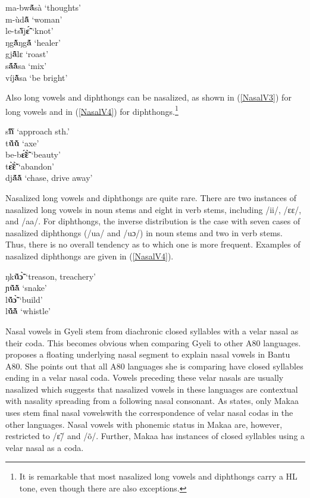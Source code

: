 \begin{exe} \ex \label{NasalV2}
ma-bw{\bfseries ã́}sà `thoughts' \\
 m-ùd{\bfseries ã̂} `woman' \\
le-ts{\bfseries ĩ̀}j{\bfseries ɛ̃́} `knot' \\
ŋg{\bfseries ã̀}ŋg{\bfseries ã́} `healer' \\
gj{\bfseries ã̂}lɛ `roast' \\
s{\bfseries ã́ã̀}sa `mix' \\
víj{\bfseries ã̀}sa `be bright'
\end{exe}

\noindent Also long vowels and diphthongs can be nasalized, as shown in (\ref{NasalV3}) for long vowels and in (\ref{NasalV4}) for diphthongs.\footnote{It is remarkable that most nasalized long vowels and diphthongs carry a HL tone, even though there are also exceptions.}

\begin{exe} \ex \label{NasalV3}
s{\bfseries ĩ́ĩ̀} `approach sth.' \\
t{\bfseries ṹũ̀} `axe' \\
be-b{\bfseries ɛ̃́ɛ̃̀} `beauty' \\
t{\bfseries ɛ̃̀ɛ̃̀} `abandon' \\
dj{\bfseries ã́ã̀} `chase, drive away'
\end{exe}

\noindent Nasalized long vowels and diphthongs are quite rare. There are two instances of nasalized long vowels in noun stems and eight in verb stems, including /ii/, /ɛɛ/, and /aa/. For diphthongs, the inverse distribution is the case with seven cases of nasalized diphthongs (/ua/ and /uɔ/) in noun stems and two in verb stems. Thus, there is no overall tendency as to which one is more frequent. Examples of nasalized diphthongs are given in (\ref{NasalV4}).

\begin{exe} \ex \label{NasalV4}
ŋk{\bfseries ṹɔ̃̀} `treason, treachery' \\
ɲ{\bfseries ṹã̀} `snake' \\
l{\bfseries ṹɔ̃̀} `build' \\
l{\bfseries ṹã̀} `whistle'
\end{exe}

Nasal vowels in Gyeli stem from diachronic closed syllables with a velar nasal as their coda. This becomes obvious when comparing Gyeli to other A80 languages. \citet[329]{cheucle2014} proposes a floating underlying nasal segment to explain nasal vowels in Bantu A80. She points out that all A80 languages she is comparing have closed syllables ending in a velar nasal coda. Vowels preceding these velar nasals are usually nasalized which suggests that nasalized vowels in these languages are contextual with nasality spreading from a following nasal consonant. As \citet[329]{cheucle2014} states,  only Makaa uses stem final nasal vowels\textemdash with the correspondence of velar nasal codas in the other languages. Nasal vowels with phonemic status in Makaa are, however, restricted to /ɛ̃/ and /õ/. Further, Makaa has instances of closed syllables using a velar nasal as a coda.

